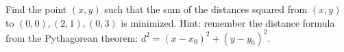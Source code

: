 \documentclass[12pt, a4paper]{article}
\begin{document}
\begin{ex}
  Find the point \((x,y)\) such that the sum of the distances squared
  from \((x,y)\) to \((0,0), (2,1), (0,3)\) is minimized. Hint:
  remember the distance formula from the Pythagorean theorem: \(d^2 =
  (x-x_0)^2 + (y-y_0)^2\).
\end{ex}
\end{document}
